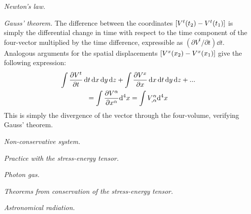 \documentclass{report}
\begin{document}
\begin{subquests}
	\item \emph{Newton's law.}

	\item \emph{Gauss' theorem.}
	The difference between the coordinates $\bqty{V^t(t_2) - V^t(t_1)}$ is simply the differential change in time with respect to the time component of the four-vector multiplied by the time difference, expressible as $(\partial V^t/\partial t)\dd{t}$. Analogous arguments for the spatial displacements $\bqty{V^x(x_2) - V^x(x_1)}$ give the following expression:
	\begin{gather*}
		\int \pdv{V^t}{t} \dd{t}\dd{x}\dd{y}\dd{z} + \int \pdv{V^x}{x}\dd{x}\dd{t}\dd{y}\dd{z} + ... \\
		= \int \pdv{V^{\alpha}}{x^{\alpha}} \dd^4{x} = \int V^{\alpha}_{,\alpha} \dd^4{x}
	\end{gather*}
	This is simply the divergence of the vector through the four-volume, verifying Gauss' theorem.

	\item \emph{Non-conservative system.}
	\begin{subquests}
		\item

		\item
	\end{subquests}

	\item \emph{Practice with the stress-energy tensor.}
	\begin{subquests}
		\item

		\item

		\item
	\end{subquests}

	\item \emph{Photon gas.}

	\item \emph{Theorems from conservation of the stress-energy tensor.}
	\begin{subquests}
		\item

		\item

		\item
	\end{subquests}
	
	\item \emph{Astronomical radiation.}
	\begin{subquests}
		\item


\end{subquests}
\end{subquests}
\end{document}
